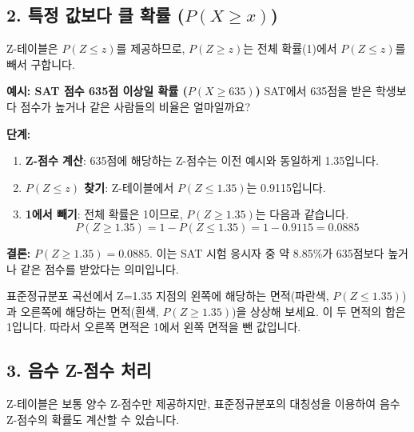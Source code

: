 \documentclass[11pt,a4paper]{book}
\theoremstyle{definition}
\begin{document}
\subsection{2. 특정 값보다 클 확률 ($P(X \ge x)$)}
Z-테이블은 $P(Z \le z)$를 제공하므로, $P(Z \ge z)$는 전체 확률(1)에서 $P(Z \le z)$를 빼서 구합니다.

\begin{examplebox}
\textbf{예시: SAT 점수 635점 이상일 확률 ($P(X \ge 635)$)}
SAT에서 635점을 받은 학생보다 점수가 높거나 같은 사람들의 비율은 얼마일까요?

\textbf{단계:}
\begin{enumerate}
    \item \textbf{Z-점수 계산}: 635점에 해당하는 Z-점수는 이전 예시와 동일하게 1.35입니다.
    \item \textbf{$P(Z \le z)$ 찾기}: Z-테이블에서 $P(Z \le 1.35)$는 0.9115입니다.
    \item \textbf{1에서 빼기}: 전체 확률은 1이므로, $P(Z \ge 1.35)$는 다음과 같습니다.
    \[ P(Z \ge 1.35) = 1 - P(Z \le 1.35) = 1 - 0.9115 = 0.0885 \]
\end{enumerate}
\textbf{결론:} $P(Z \ge 1.35) = 0.0885$. 이는 SAT 시험 응시자 중 약 8.85\%가 635점보다 높거나 같은 점수를 받았다는 의미입니다.

\begin{tcolorbox}[title={\textbf{시각적 이해}, colback=lightblue!50!white, colframe=darkblue}]
표준정규분포 곡선에서 Z=1.35 지점의 왼쪽에 해당하는 면적(파란색, $P(Z \le 1.35)$)과 오른쪽에 해당하는 면적(흰색, $P(Z \ge 1.35)$)을 상상해 보세요. 이 두 면적의 합은 1입니다. 따라서 오른쪽 면적은 1에서 왼쪽 면적을 뺀 값입니다.
\end{tcolorbox}
\end{examplebox}

\subsection{3. 음수 Z-점수 처리}
Z-테이블은 보통 양수 Z-점수만 제공하지만, 표준정규분포의 대칭성을 이용하여 음수 Z-점수의 확률도 계산할 수 있습니다.
\end{document}
